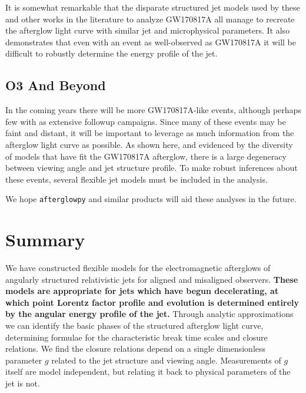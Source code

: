 \documentclass[twocolumn]{aastex62}
\newcommand{\gwbns}{GW170817A}
\newcommand{\afterglowpy}{{\tt afterglowpy}}
\begin{document}
It is somewhat remarkable that the disparate structured jet models used by these and other works in the literature to analyze \gwbns{} all manage to recreate the afterglow light curve with similar jet and microphysical parameters.  It also demonstrates that even with an event as well-observed as \gwbns{} it will be difficult to robustly determine the energy profile of the jet.

\subsection{O3 And Beyond}

In the coming years there will be more \gwbns{}-like events, although perhaps few with as extensive followup campaigns.  Since many of these events may be faint and distant, it will be important to leverage as much information from the afterglow light curve as possible.  As shown here, and evidenced by the diversity of models that have fit the \gwbns{} afterglow, there is a large degeneracy between viewing angle and jet structure profile.  To make robust inferences about these events, several flexible jet models must be included in the analysis.  

We hope \afterglowpy{} and similar products will aid these analyses in the future.  

\section{Summary}\label{sec:summary}

We have constructed flexible models for the electromagnetic afterglows of angularly structured relativistic jets for aligned and misaligned observers.  {\bf These models are appropriate for jets which have begun decelerating, at which point Lorentz factor profile and evolution is determined entirely by the angular energy profile of the jet.}  Through analytic approximations we can identify the basic phases of the structured afterglow light curve, determining formulae for the characteristic break time scales and closure relations.  We find the closure relations depend on a single dimensionless parameter $g$ related to the jet structure and viewing angle.  Measurements of $g$ itself are model independent, but relating it back to physical parameters of the jet is not.
\end{document}
